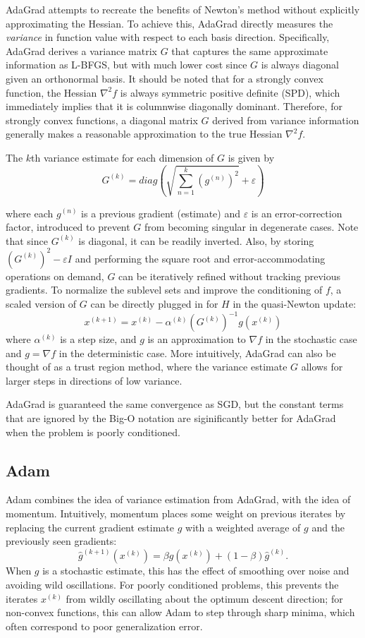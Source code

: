 \documentclass[conference]{ieeeconf}  %
\begin{document}
AdaGrad \cite{duchi2013proximal} attempts to recreate the benefits of
Newton's method without explicitly approximating the Hessian.  To
achieve this, AdaGrad directly measures the \textit{variance} in
function value with respect to each basis direction.  Specifically,
AdaGrad derives a variance matrix $G$ that captures the same
approximate information as L-BFGS, but with much lower cost since $G$
is always diagonal given an orthonormal basis.  It should be noted
that for a strongly convex function, the Hessian $\nabla^2 f$ is
always symmetric positive definite (SPD), which immediately implies
that it is columnwise diagonally dominant.  Therefore, for strongly
convex functions, a diagonal matrix $G$ derived from variance
information generally makes a reasonable approximation to the true
Hessian $\nabla^2 f$.

The $k$th variance estimate for each dimension of $G$ is given by
$$ G^{(k)} = diag\left(\sqrt{\sum_{n=1}^k (g^{(n)})^2} + \varepsilon\right) $$

where each $g^{(n)}$ is a previous gradient (estimate) and
$\varepsilon$ is an error-correction factor, introduced to prevent $G$
from becoming singular in degenerate cases.  Note that since $G^{(k)}$
is diagonal, it can be readily inverted.  Also, by storing
$\left(G^{(k)}\right)^2 - \varepsilon I$ and performing the square
root and error-accommodating operations on demand, $G$ can be
iteratively refined without tracking previous gradients.  To normalize
the sublevel sets and improve the conditioning of $f$, a scaled
version of $G$ can be directly plugged in for $H$ in the quasi-Newton
update:
$$ x^{(k+1)} = x^{(k)} - \alpha^{(k)} (G^{(k)})^{-1} g(x^{(k)}) $$
where $\alpha^{(k)}$ is a step size, and $g$ is an approximation to
$\nabla f$ in the stochastic case and $g = \nabla f$ in the
deterministic case.  More intuitively, AdaGrad can also be thought of
as a trust region method, where the variance estimate $G$ allows for
larger steps in directions of low variance.

AdaGrad is guaranteed the same convergence as SGD, but the constant
terms that are ignored by the Big-O notation are siginificantly better
for AdaGrad when the problem is poorly conditioned.

\subsection{Adam}

Adam \cite{kingma2014adam} combines the idea of variance estimation
from AdaGrad, with the idea of momentum.  Intuitively, momentum places
some weight on previous iterates by replacing the current gradient
estimate $g$ with a weighted average of $g$ and the previously seen
gradients:
$$ \hat{g}^{(k+1)}(x^{(k)}) = \beta g(x^{(k)}) + (1-\beta)\hat{g}^{(k)}. $$
When $g$ is a stochastic estimate, this has the effect of smoothing
over noise and avoiding wild oscillations. For poorly conditioned
problems, this prevents the iterates $x^{(k)}$ from wildly oscillating
about the optimum descent direction; for non-convex functions, this
can allow Adam to step through sharp minima, which often correspond to
poor generalization error.
\end{document}
